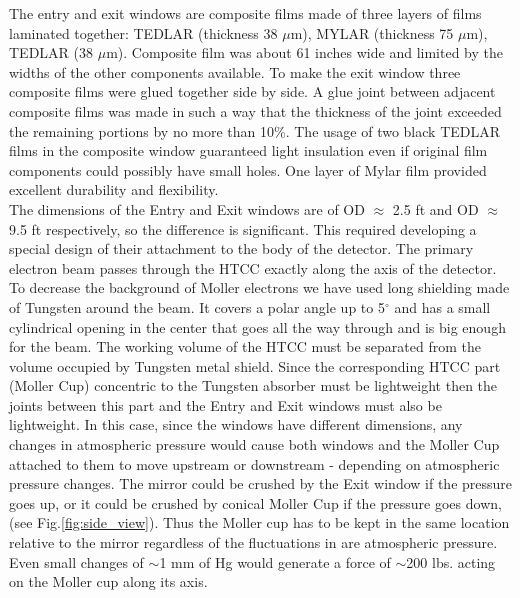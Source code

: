 \indent The entry and exit windows are composite films made of three layers of films laminated together: TEDLAR (thickness 38 $\mu$m), MYLAR (thickness 75 $\mu$m), TEDLAR (38 $\mu$m). Composite film was about 61 inches wide and limited by the widths of the other components available. To make the exit window three composite films were glued together side by side. A glue joint between adjacent composite films was made in such a way that the thickness of the joint exceeded the remaining portions by no more than 10\%. The usage of two black TEDLAR films in the composite window guaranteed light insulation even if original film components could possibly have small holes. One layer of Mylar film provided excellent durability and flexibility.
\\
\indent The dimensions of the Entry and Exit windows are of OD $\approx$ 2.5 ft and OD $\approx$ 9.5 ft respectively, so the difference is significant. This required developing a special design of their attachment to the body of the detector. The primary electron beam passes through the HTCC exactly along the axis of the detector. To decrease the background of Moller electrons we have used long shielding made of Tungsten around the beam. It covers a polar angle up to 5$^\circ$ and has a small cylindrical opening in the center that goes all the way through and is big enough for the beam. The working volume of the HTCC must be separated from the volume occupied by Tungsten metal shield. Since the corresponding HTCC part (Moller Cup) concentric to the Tungsten absorber must be lightweight then the joints between this part and the Entry and Exit windows  must also be lightweight. In this case, since the windows have different dimensions, any changes in atmospheric pressure would cause both windows and the Moller Cup attached to them to move upstream or downstream - depending on atmospheric pressure changes. The mirror could be crushed by the Exit window if the pressure goes up, or it could be crushed by conical Moller Cup if the pressure goes down, (see Fig.\ref{fig:side_view}). Thus the Moller cup has to be kept in the same location relative to the mirror regardless of the fluctuations in are atmospheric pressure. Even small changes of $\sim$1 mm of Hg would generate a force of $\sim$200 lbs. acting on the Moller cup along its axis.  

